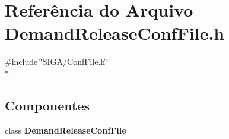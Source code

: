 \section{Referência do Arquivo Demand\+Release\+Conf\+File.\+h}
\label{_demand_release_conf_file_8h}
{\ttfamily \#include \char`\"{}S\+I\+G\+A/\+Conf\+File.\+h\char`\"{}}\\*
\subsection*{Componentes}
\begin{DoxyCompactItemize}
\item 
class {\bf Demand\+Release\+Conf\+File}
\end{DoxyCompactItemize}
